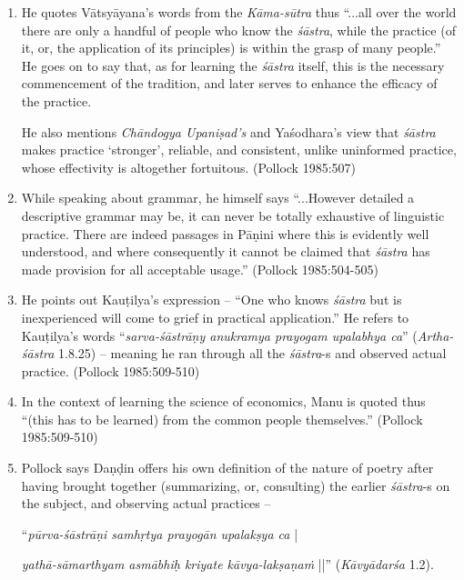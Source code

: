 \begin{enumerate}
\item He quotes Vātsyāyana's words from the {\it Kāma-sūtra} thus ``...all over the world there are only a handful of people who know the {\it śāstra}, while the practice (of it, or, the application of its principles) is within the grasp of many people.'' He goes on to say that, as for learning the {\it śāstra} itself, this is the necessary commencement of the tradition, and later serves to enhance the efficacy of the practice. 

He also mentions \textsl{Chāndogya Upaniṣad's} and Yaśodhara's view that {\it śāstra} makes practice `stronger', reliable, and consistent, unlike uninformed practice, whose effectivity is altogether fortuitous. (Pollock 1985:507)

\item While speaking about grammar, he himself says ``...However detailed a descriptive grammar may be, it can never be totally exhaustive of linguistic practice. There are indeed passages in Pāṇini where this is evidently well understood, and where consequently it cannot be claimed that {\it śāstra} has made provision for all acceptable usage.'' (Pollock 1985:504-505)

\item He points out Kauṭilya's expression -- ``One who knows {\it śāstra} but is inexperienced will come to grief in practical application.'' He refers to Kauṭilya's words ``\textsl{sarva-śāstrāṇy anukramya prayogam upalabhya ca}'' (\textsl{Artha-śāstra} 1.8.25) -- meaning he ran through all the {\it śāstra}-s and observed actual practice. (Pollock 1985:509-510)

\item In the context of learning the science of economics, Manu is quoted thus ``(this has to be learned) from the common people themselves.'' (Pollock 1985:509-510)

\item Pollock says Daṇḍin offers his own definition of the nature of poetry after having brought together (summarizing, or, consulting) the earlier {\it śāstra}-s on the subject, and observing actual practices -- 

``\textsl{pūrva-śāstrāṇi samhṛtya prayogān upalakṣya ca} | 

\textsl{yathā-\break sāmarthyam asmābhiḥ kriyate kāvya-lakṣaṇaṁ} ||'' (\textsl{Kāvyādarśa} 1.2).


\end{enumerate}
